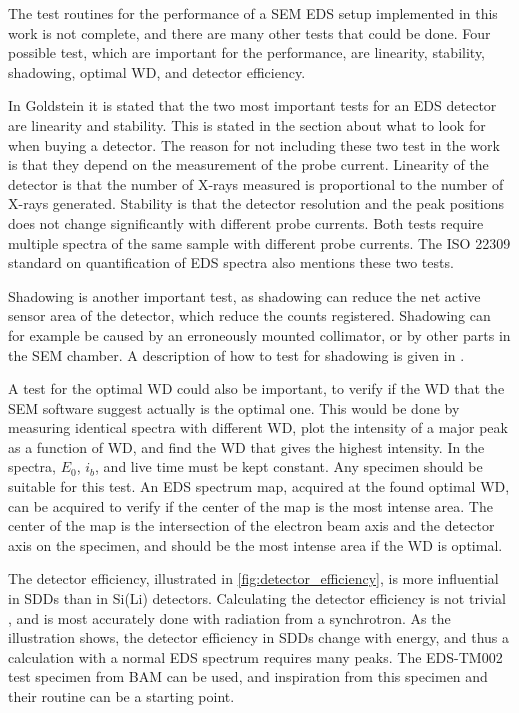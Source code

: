 The test routines for the performance of a SEM EDS setup implemented in this work is not complete, and there are many other tests that could be done.
Four possible test, which are important for the performance, are linearity, stability, shadowing, optimal WD, and detector efficiency.

In Goldstein \cite[p. 232]{goldstein_scanning_2018} it is stated that the two most important tests for an EDS detector are linearity and stability.
This is stated in the section about what to look for when buying a detector.
The reason for not including these two test in the work is that they depend on the measurement of the probe current.
Linearity of the detector is that the number of X-rays measured is proportional to the number of X-rays generated.
Stability is that the detector resolution and the peak positions does not change significantly with different probe currents.
Both tests require multiple spectra of the same sample with different probe currents.
The ISO 22309 standard on quantification of EDS spectra \cite{iso_quantification_22309} also mentions these two tests.

Shadowing is another important test, as shadowing can reduce the net active sensor area of the detector, which reduce the counts registered.
Shadowing can for example be caused by an erroneously mounted collimator, or by other parts in the SEM chamber.
A description of how to test for shadowing is given in \cite{shadowing_procop_2016}.

A test for the optimal WD could also be important, to verify if the WD that the SEM software suggest actually is the optimal one.
This would be done by measuring identical spectra with different WD, plot the intensity of a major peak as a function of WD, and find the WD that gives the highest intensity.
In the spectra, $E_0$, $i_b$, and live time must be kept constant.
Any specimen should be suitable for this test.
An EDS spectrum map, acquired at the found optimal WD, can be acquired to verify if the center of the map is the most intense area.
The center of the map is the intersection of the electron beam axis and the detector axis on the specimen, and should be the most intense area if the WD is optimal.

The detector efficiency, illustrated in \cref{fig:detector_efficiency}, is more influential in SDDs than in Si(Li) detectors.
Calculating the detector efficiency is not trivial \cite{rackwitz_2015_bam}, and is most accurately done with radiation from a synchrotron.
As the illustration shows, the detector efficiency in SDDs change with energy, and thus a calculation with a normal EDS spectrum requires many peaks.
The EDS-TM002 test specimen from BAM \cite{rackwitz_2015_bam} can be used, and inspiration from this specimen and their routine can be a starting point.

